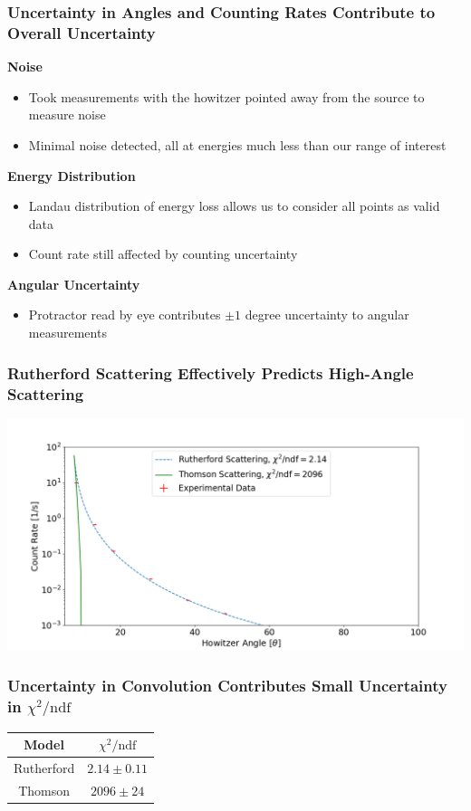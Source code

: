 \documentclass{beamer}
\begin{document}
    \begin{frame}
      \frametitle{Uncertainty in Angles and Counting Rates Contribute to Overall Uncertainty}
             \textbf{Noise}
      \pause
      \begin{itemize}
        \item Took measurements with the howitzer pointed away from the source to measure noise
          \pause
        \item Minimal noise detected, all at energies much less than our range of interest
      \end{itemize}
      \pause
      \textbf{Energy Distribution}
      \begin{itemize}
        \pause
    \item Landau distribution of energy loss allows us to consider all points as valid data
      \pause
    \item Count rate still affected by counting uncertainty
  \end{itemize}
  \pause

 \textbf{Angular Uncertainty}
  \begin{itemize}
    \pause
  \item Protractor read by eye contributes $\pm 1$ degree uncertainty to angular measurements 
  \end{itemize}
\end{frame}

\begin{frame}
  \frametitle{Rutherford Scattering Effectively Predicts High-Angle Scattering}
    \includegraphics[width=1.0\textwidth]{plot-correct.png}
\end{frame}

\begin{frame}
\frametitle{Uncertainty in Convolution Contributes Small Uncertainty in $\chi^2/\text{ndf}$}
  \begin{table}
    \begin{tabular}{cc}
    Model & $\chi^2/\text{ndf}$ \\
    \hline
    Rutherford & $2.14 \pm 0.11$ \\
    Thomson & $2096 \pm 24$ \\
  \end{tabular}
  \end{table}
\end{frame}
\end{document}
